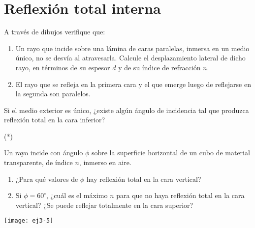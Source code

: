 \section*{Reflexión total interna}

\item A través de dibujos verifique que:
\begin{enumerate}
	\item Un rayo que incide sobre una lámina de caras paralelas, inmersa en un medio único, no se desvía al atravesarla. Calcule el desplazamiento lateral de dicho rayo, en términos de su espesor $d$ y de su índice de refracción $n$.
	\item El rayo que se refleja en la primera cara y el que emerge luego de reflejarse en la segunda son paralelos.
\end{enumerate}
Si el medio exterior es único, ¿existe algún ángulo de incidencia tal que produzca reflexión total en la cara inferior?



\item (*)
\begin{minipage}[t][3.5cm]{0.75\textwidth}
Un rayo incide con ángulo $\phi$ sobre la superficie horizontal de un cubo de material transparente, de índice $n$, inmerso en aire.
\begin{enumerate}
	\item ¿Para qué valores de $\phi$ hay reflexión total en la cara vertical?
	\item Si $\phi=60^{\circ}$, ¿cuál es el máximo $n$ para que no haya reflexión total en la cara vertical?
	¿Se puede reflejar totalmente en la cara superior?
\end{enumerate}
\end{minipage}
\begin{minipage}[c][1.5cm][t]{0.15\textwidth}
	\texttt{[image: ej3-5]}
\end{minipage}



